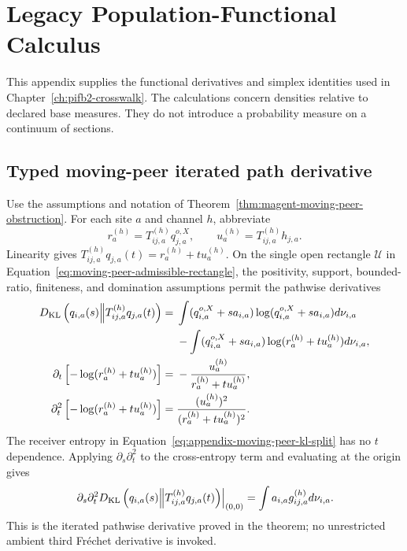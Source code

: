 \chapter{Legacy Population-Functional Calculus}

This appendix supplies the functional derivatives and simplex identities used in Chapter~\ref{ch:pifb2-crosswalk}. The calculations concern densities relative to declared base measures. They do not introduce a probability measure on a continuum of sections.

\section{Typed moving-peer iterated path derivative}
\label{sec:moving-peer-calculus-oracle}

Use the assumptions and notation of Theorem~\ref{thm:magent-moving-peer-obstruction}. For each site \(a\) and channel \(h\), abbreviate
\begin{equation}
r_a^{(h)}=T_{ij,a}^{(h)}q_{j,a}^{o,X},
\qquad
u_a^{(h)}=T_{ij,a}^{(h)}h_{j,a}.
\label{eq:appendix-moving-peer-paths}
\end{equation}
Linearity gives \(T_{ij,a}^{(h)}q_{j,a}(t)=r_a^{(h)}+t u_a^{(h)}\). On the single open rectangle \(\mathcal U\) in Equation~\eqref{eq:moving-peer-admissible-rectangle}, the positivity, support, bounded-ratio, finiteness, and domination assumptions permit the pathwise derivatives
\begin{align}
D_{\mathrm{KL}}\left(q_{i,a}(s)\middle\Vert
T_{ij,a}^{(h)}q_{j,a}(t)\right)
={}&\int(q_{i,a}^{o,X}+s a_{i,a})
\log(q_{i,a}^{o,X}+s a_{i,a})d\nu_{i,a}
\notag\\
&-\int(q_{i,a}^{o,X}+s a_{i,a})
\log(r_a^{(h)}+t u_a^{(h)})d\nu_{i,a},
\label{eq:appendix-moving-peer-kl-split}\\
\partial_t\left[-\log(r_a^{(h)}+t u_a^{(h)})\right]
={}&-\frac{u_a^{(h)}}{r_a^{(h)}+t u_a^{(h)}},
\label{eq:appendix-moving-peer-first-sender}\\
\partial_t^2\left[-\log(r_a^{(h)}+t u_a^{(h)})\right]
={}&\frac{(u_a^{(h)})^2}
{(r_a^{(h)}+t u_a^{(h)})^2}.
\label{eq:appendix-moving-peer-second-sender}
\end{align}
The receiver entropy in Equation~\eqref{eq:appendix-moving-peer-kl-split} has no \(t\) dependence. Applying \(\partial_s\partial_t^2\) to the cross-entropy term and evaluating at the origin gives
\begin{equation}
\left.\partial_s\partial_t^2
D_{\mathrm{KL}}\left(q_{i,a}(s)\middle\Vert
T_{ij,a}^{(h)}q_{j,a}(t)\right)\right|_{(0,0)}
=\int a_{i,a}g_{ij,a}^{(h)}d\nu_{i,a}.
\label{eq:appendix-moving-peer-third-variation}
\end{equation}
This is the iterated pathwise derivative proved in the theorem; no unrestricted ambient third Fr\'echet derivative is invoked.

